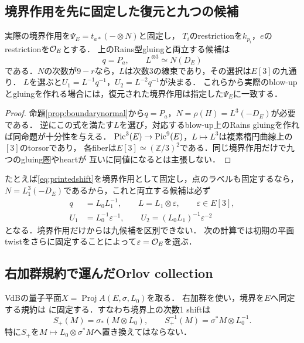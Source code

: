 \subsection{境界作用を先に固定した復元と九つの候補}
\begin{proposition}\label{prop:boundaryfirst}
実際の境界作用を$\Psi_E=t_{a*}(-\otimes N)$と固定し，
$T_i$のrestrictionを$k_{p_i}$，$e$のrestrictionを$\mathcal O_E$とする．
上のRains型gluingと両立する候補は
\[
 q=P_a,\qquad L^{\otimes3}\simeq N(D_E)
\]
である．$N$の次数が$9-r$なら，$L$は次数3の線束であり，その選択は$E[3]$の九通り．
$L$を選ぶと$U_1=L^{-1}q^{-1}$，$U_2=L^{-2}q^{-1}$が決まる．
これらから実際のblow-upとgluingを作れる場合には，復元された境界作用は指定した$\Psi_E$に一致する．
\end{proposition}
\begin{proof}
命題\ref{prop:boundarynormal}から$q=P_a$，$N=\rho(H)=L^3(-D_E)$が必要である．
逆にこの式を満たす$L$を選び，対応するblow-up上のRains gluingを作れば同命題が十分性を与える．
$\operatorname{Pic}^3(E)\to\operatorname{Pic}^9(E)$，$L\mapsto L^3$は複素楕円曲線上の$[3]$のtorsorであり，
各fiberは$E[3]\simeq(\mathbb Z/3)^2$である．同じ境界作用だけで九つのgluing圏やheartが
互いに同値になるとは主張しない．
\end{proof}

たとえば\eqref{eq:printedshift}を境界作用として固定し，点のラベルも固定するなら，
$N=L_1^3(-D_E)$であるから，これと両立する候補は必ず
\begin{equation}\label{eq:boundaryfirst-AOU}
 \begin{split}
 q&=L_0L_1^{-1},\qquad L=L_1\otimes\varepsilon,\qquad\varepsilon\in E[3],\\
 U_1&=L_0^{-1}\varepsilon^{-1},\qquad
 U_2=(L_0L_1)^{-1}\varepsilon^{-2}
 \end{split}
\end{equation}
となる．境界作用だけからは九候補を区別できない．
次の計算では初期の平面twistをさらに固定することによって$\varepsilon=\mathcal O_E$を選ぶ．


\subsection{右加群規約で運んだOrlov collection}
VdBの量子平面$X=\operatorname{Proj}A(E,\sigma,L_0)$を取る．
右加群を使い，境界を$E$へ同定する規約は
\cite[(5.4), \S10冒頭]{VdB}に固定する．すなわち境界上の次数1 shiftは
\begin{equation}\label{eq:right-plane-shift}
 S_+(M)=\sigma_*(M\otimes L_0),\qquad
 S_+^{-1}(M)=\sigma^*M\otimes L_0^{-1}.
\end{equation}
特に$S_+$を$M\mapsto L_0\otimes\sigma^*M$へ置き換えてはならない．

